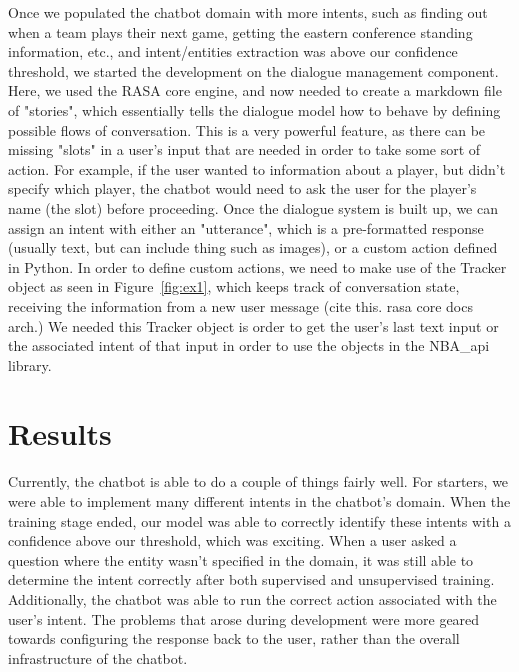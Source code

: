\documentclass[conference]{IEEEtran}
\begin{document}
Once we populated the chatbot domain with more intents, such as finding out when a team plays their next game, getting the eastern conference standing information, etc., and intent/entities extraction was above our confidence threshold, we started the development on the dialogue management component. Here, we used the RASA core engine, and now needed to create a markdown file of "stories", which essentially tells the dialogue model how to behave by defining possible flows of conversation. This is a very powerful feature, as there can be missing "slots" in a user's input that are needed in order to take some sort of action. For example, if the user wanted to information about a player, but didn't specify which player, the chatbot would need to ask the user for the player's name (the slot) before proceeding. Once the dialogue system is built up, we can assign an intent with either an "utterance", which is a pre-formatted response (usually text, but can include thing such as images), or a custom action defined in Python. In order to define custom actions, we need to make use of the Tracker object as seen in Figure~\ref{fig:ex1}, which keeps track of conversation state, receiving the information from a new user message (cite this. rasa core docs arch.) We needed this Tracker object is order to get the user's last text input or the associated intent of that input in order to use the objects in the NBA\_api library.

\section*{Results}
Currently, the chatbot is able to do a couple of things fairly well. For starters, we were able to implement many different intents in the chatbot's domain. When the training stage ended, our model was able to correctly identify these intents with a confidence above our threshold, which was exciting. When a user asked a question where the entity wasn't specified in the domain, it was still able to determine the intent correctly after both supervised and unsupervised training. Additionally, the chatbot was able to run the correct action associated with the user's intent. The problems that arose during development were more geared towards configuring the response back to the user, rather than the overall infrastructure of the chatbot.
\end{document}
